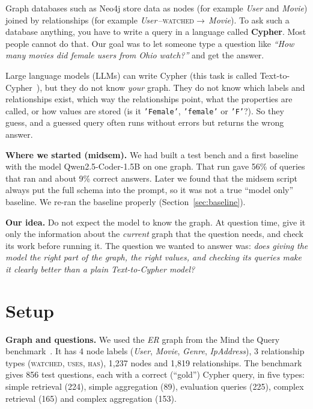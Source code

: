 \documentclass[11pt,a4paper]{article}
\begin{document}
Graph databases such as Neo4j store data as nodes (for example \emph{User} and
\emph{Movie}) joined by relationships (for example \emph{User}\,--\textsc{watched}$\to$\,\emph{Movie}). To ask such a database anything, you have to write a query in a language
called \textbf{Cypher}. Most people cannot do that. Our goal was to let someone type a
question like \emph{``How many movies did female users from Ohio watch?''} and get the
answer.

Large language models (LLMs) can write Cypher (this task is called Text-to-Cypher~\cite{neo4jdata,neo4jguide}),
but they do not know \emph{your} graph.
They do not know which labels and relationships exist, which way the relationships
point, what the properties are called, or how values are stored (is it
\texttt{'Female'}, \texttt{'female'} or \texttt{'F'}?). So they guess, and a guessed
query often runs without errors but returns the wrong answer.

\textbf{Where we started (midsem).} We had built a test bench and a first baseline with
the model Qwen2.5-Coder-1.5B on one graph. That run gave 56\% of queries that ran and
about 9\% correct answers. Later we found that the midsem script always put the full
schema into the prompt, so it was not a true ``model only'' baseline. We re-ran the
baseline properly (Section~\ref{sec:baseline}).

\textbf{Our idea.} Do not expect the model to know the graph. At question time, give it
only the information about the \emph{current} graph that the question needs, and check
its work before running it. The question we wanted to answer was:
\emph{does giving the model the right part of the graph, the right values, and checking
its queries make it clearly better than a plain Text-to-Cypher model?}

\section{Setup}

\textbf{Graph and questions.} We used the \emph{ER} graph from the Mind the Query
benchmark~\cite{mtq}. It has 4 node labels (\emph{User}, \emph{Movie}, \emph{Genre},
\emph{IpAddress}), 3 relationship types (\textsc{watched}, \textsc{uses}, \textsc{has}),
1{,}237 nodes and 1{,}819 relationships. The benchmark gives 856 test questions, each with
a correct (``gold'') Cypher query, in five types: simple retrieval (224), simple
aggregation (89), evaluation queries (225), complex retrieval (165) and complex
aggregation (153).
\end{document}
